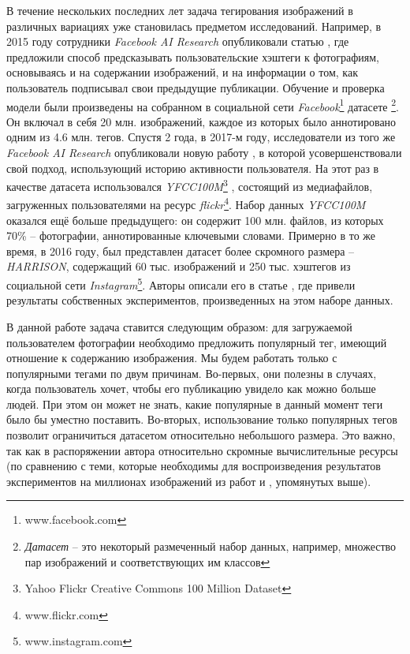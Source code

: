 \indent
\indent
В течение нескольких последних лет
задача тегирования изображений в различных вариациях уже становилась
предметом исследований. Например, в 2015 году сотрудники
\textit{Facebook AI Research} опубликовали статью
\cite{hashtags_facebook2015}, где предложили способ
предсказывать пользовательские
хэштеги к фотографиям, основываясь и на содержании 
изображений, и на информации о том, как пользователь подписывал
свои предыдущие публикации. Обучение и проверка модели были 
произведены на собранном в социальной сети
\textit{Facebook}\footnote{www.facebook.com}
датасете \footnote{\textit{Датасет} -- это некоторый размеченный набор данных,
например, множество пар изображений и соответствующих им классов}.
Он включал в себя 20 млн. изображений, каждое из которых было
аннотировано одним из 4.6 млн. тегов. Спустя 2 года,
в 2017-м году, исследователи
из того же \textit{Facebook AI Research} опубликовали 
новую работу \cite{hashtags_facebook2017},
в которой усовершенствовали свой подход,
использующий историю активности пользователя. На этот раз
в качестве датасета использовался 
\textit{YFCC100M}\footnote{Yahoo Flickr Creative Commons 100 Million Dataset}
\cite{yfcc100m},
состоящий из медиафайлов, загруженных пользователями на ресурс
\textit{flickr}\footnote{www.flickr.com}. 
Набор данных \textit{YFCC100M} оказался ещё больше предыдущего:
он содержит 100 млн. файлов, из которых 70\% -- фотографии, аннотированные
ключевыми словами. Примерно в то же время, в 2016 году, был представлен 
датасет более скромного размера -- \textit{HARRISON},
содержащий 60 тыс. изображений  и 250 тыс. хэштегов из социальной сети 
\textit{Instagram}\footnote{www.instagram.com}. Авторы описали его
в статье \cite{harrison}, где привели результаты
собственных экспериментов, произведенных на этом 
наборе данных.


\indent
\indent
В данной работе задача ставится следующим образом: для загружаемой 
пользователем фотографии необходимо предложить популярный тег,
имеющий отношение к содержанию изображения. Мы будем работать
только с популярными тегами по двум причинам.
Во-первых, они полезны в 
случаях, когда пользователь хочет, чтобы его публикацию увидело как можно
больше людей. При этом он может не знать, какие популярные в данный момент
теги было бы уместно поставить. 
Во-вторых, использование только популярных тегов 
позволит ограничиться датасетом относительно небольшого размера. 
Это важно, так как в распоряжении автора относительно скромные вычислительные
ресурсы (по сравнению с теми, которые необходимы для воспроизведения
результатов экспериментов на миллионах изображений из работ
\cite{hashtags_facebook2015} и \cite{hashtags_facebook2017}, упомянутых выше).


